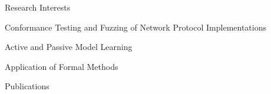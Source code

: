 \documentclass{resume} %
\begin{document}
\begin{rSection}{Research Interests}
\item Conformance Testing and Fuzzing of Network Protocol Implementations
\item Active and Passive Model Learning
\item Application of Formal Methods
\end{rSection}



\begin{rSection}{Publications}

\item {}
\smallskip{}
\item {}
\smallskip{}
\item {}
\smallskip{}
\item {}
\smallskip{}
\item {}
\smallskip{}
\item {}
\smallskip{}
\item {}
\smallskip{}
\item {}
%
%
\end{rSection}

\end{document}
